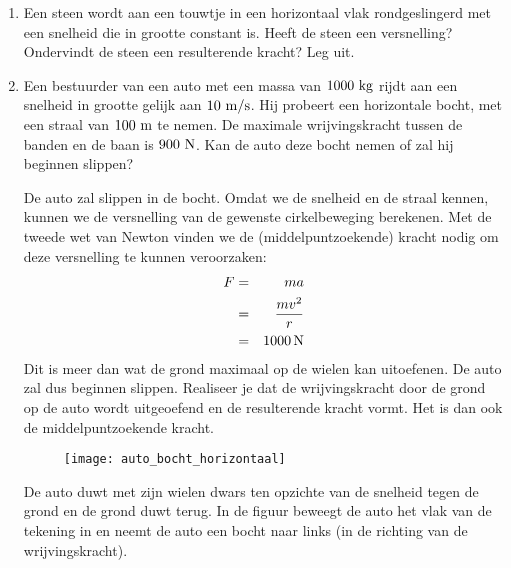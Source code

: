 \begin{enumerate}
\item Een steen wordt aan een touwtje in een horizontaal vlak rondgeslingerd met een snelheid die in grootte constant is. Heeft de steen een versnelling? Ondervindt de steen een resulterende kracht? Leg uit.


\item Een bestuurder van een auto met een massa van $1000~\rm kg$ rijdt aan een snelheid in grootte gelijk aan $10~\rm m/s$. Hij probeert een horizontale bocht, met een straal van $100~\rm m$ te nemen. De maximale wrijvingskracht tussen de banden en de baan is $900~\rm N$. Kan de auto deze bocht nemen of zal hij beginnen slippen?
\begin{oplossing}
\newline
\newline
De auto zal slippen in de bocht. Omdat we de snelheid en de straal kennen, kunnen we de versnelling van de gewenste cirkelbeweging berekenen. Met de tweede wet van Newton vinden we de (middelpuntzoekende) kracht nodig om deze versnelling te kunnen veroorzaken:
\begin{eqnarray*}
F&=&ma\\
&=&\frac{mv^2}{r}\\
&=&1000\rm\,N
\end{eqnarray*}
Dit is meer dan wat de grond maximaal op de wielen kan uitoefenen. De auto zal dus beginnen slippen.
\newline
\newline
Realiseer je dat de wrijvingskracht door de grond op de auto wordt uitgeoefend en de resulterende kracht vormt. Het is dan ook de middelpuntzoekende kracht. 
\begin{figure}[h]
\centering\texttt{[image: auto\_bocht\_horizontaal]}
\end{figure}
De auto duwt met zijn wielen dwars ten opzichte van de snelheid tegen de grond en de grond duwt terug. In de figuur beweegt de auto het vlak van de tekening in en neemt de auto een bocht naar links (in de richting van de wrijvingskracht).
\end{oplossing}




\end{enumerate}
